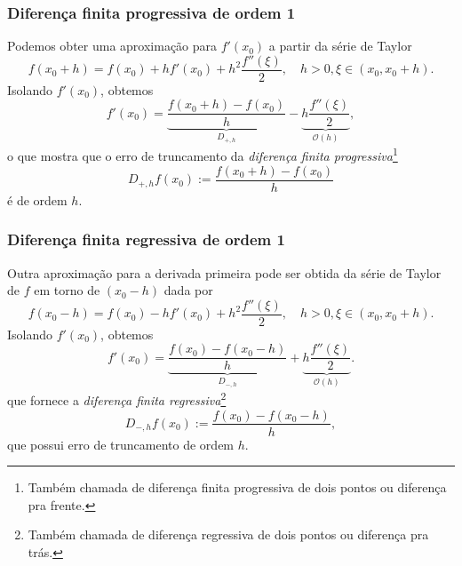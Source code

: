\subsubsection{Diferença finita progressiva de ordem 1}
Podemos obter uma aproximação para $f'(x_0)$ a partir da série de Taylor
\begin{equation*}
  f(x_0+h) = f(x_0) + hf'(x_0) + h^2\frac{f''(\xi)}{2},\quad h>0, \xi\in(x_0,x_0+h).
\end{equation*}
Isolando $f'(x_0)$, obtemos
\begin{equation}\label{eq:dp_trunc}
  f'(x_0) = \underbrace{\frac{f(x_0+h) - f(x_0)}{h}}_{D_{+,h}} - \underbrace{h\frac{f''(\xi)}{2}}_{\mathcal{O}(h)},
\end{equation}
o que mostra que o erro de truncamento da \emph{diferença finita progressiva}\footnote{Também chamada de diferença finita progressiva de dois pontos ou diferença pra frente.}
\begin{equation*}
  D_{+,h}f(x_0) := \frac{f(x_0+h)-f(x_0)}{h}
\end{equation*}
é de ordem $h$.

\subsubsection{Diferença finita regressiva de ordem 1}
Outra aproximação para a derivada primeira pode ser obtida da série de Taylor de $f$ em torno de $(x_0-h)$ dada por
\begin{equation*}
  f(x_0-h) = f(x_0) - hf'(x_0) + h^2\frac{f''(\xi)}{2},\quad h>0, \xi\in(x_0, x_0+h).
\end{equation*}
Isolando $f'(x_0)$, obtemos
\begin{equation*}
  f'(x_0) = \underbrace{\frac{f(x_0) - f(x_0-h)}{h}}_{D_{-,h}} + \underbrace{h\frac{f''(\xi)}{2}}_{\mathcal{O}(h)}.
\end{equation*}
que fornece a \emph{diferença finita regressiva}\footnote{Também chamada de diferença regressiva de dois pontos ou diferença pra trás.}
\begin{equation*}
  D_{-,h}f(x_0) := \frac{f(x_0)-f(x_0-h)}{h},
\end{equation*}
que possui erro de truncamento de ordem $h$.

